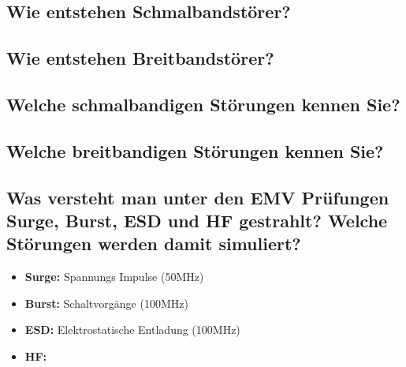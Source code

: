 \subsection{Wie entstehen Schmalbandstörer?}

\subsection{Wie entstehen Breitbandstörer?}

\subsection{Welche schmalbandigen Störungen kennen Sie?}

\subsection{Welche breitbandigen Störungen kennen Sie?}

\subsection{Was versteht man unter den EMV Prüfungen Surge, Burst, ESD und HF gestrahlt? Welche Störungen werden damit simuliert?}
\begin{itemize}
  \item \textbf{Surge:} Spannungs Impulse (50MHz)
  \item \textbf{Burst:} Schaltvorgänge (100MHz)
  \item \textbf{ESD:} Elektrostatische Entladung (100MHz)
  \item \textbf{HF:}
\end{itemize}